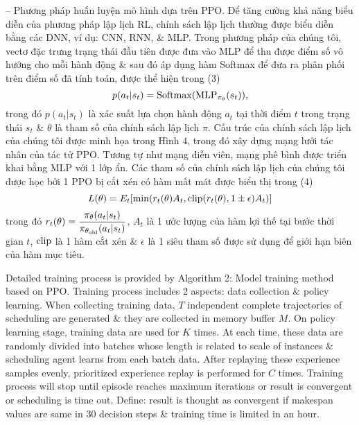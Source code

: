 \documentclass{article}
\begin{document}
\begin{itemize}
\begin{itemize}
        -- {\sf Phương pháp huấn luyện mô hình dựa trên PPO.} Để tăng cường khả năng biểu diễn của phương pháp lập lịch RL, chính sách lập lịch thường được biểu diễn bằng các DNN, ví dụ: CNN, RNN, \& MLP. Trong phương pháp của chúng tôi, vectơ đặc trưng trạng thái đầu tiên được đưa vào MLP để thu được điểm số vô hướng cho mỗi hành động \& sau đó áp dụng hàm Softmax để đưa ra phân phối trên điểm số đã tính toán, được thể hiện trong (3)
        \begin{equation*}
            p(a_t|s_t) = {\rm Softmax}({\rm MLP}_{\pi_\theta}(s_t)),
        \end{equation*}
        trong đó $p(a_t|s_t)$ là xác suất lựa chọn hành động $a_t$ tại thời điểm $t$ trong trạng thái $s_t$ \& $\theta$ là tham số của chính sách lập lịch $\pi$. Cấu trúc của chính sách lập lịch của chúng tôi được minh họa trong {\sf Hình 4}, trong đó xây dựng mạng lưới tác nhân của tác tử PPO. Tương tự như mạng diễn viên, mạng phê bình được triển khai bằng MLP với 1 lớp ẩn. Các tham số của chính sách lập lịch của chúng tôi được học bởi 1 PPO bị cắt xén có hàm mất mát được biểu thị trong (4)
        \begin{equation*}
            L(\theta) = E_t[\min(r_t(\theta)A_t,{\rm clip}(r_t(\theta),1\pm\epsilon)A_t)]
        \end{equation*}
        trong đó $r_t(\theta) = \dfrac{\pi_\theta(a_t|s_t)}{\pi_{\theta_{\rm old}}(a_t|s_t)}$, $A_t$ là 1 ước lượng của hàm lợi thế tại bước thời gian $t$, ${\rm clip}$ là 1 hàm cắt xén \& $\epsilon$ là 1 siêu tham số được sử dụng để giới hạn biên của hàm mục tiêu.

        Detailed training process is provided by {\sf Algorithm 2: Model training method based on PPO}. Training process includes 2 aspects: data collection \& policy learning. When collecting training data, $T$ independent complete trajectories of scheduling are generated \& they are collected in memory buffer $M$. On policy learning stage, training data are used for $K$ times. At each time, these data are randomly divided into batches whose length is related to scale of instances \& scheduling agent learns from each batch data. After replaying these experience samples evenly, prioritized experience replay is performed for $C$ times. Training process will stop until episode reaches maximum iterations or result is convergent or scheduling is time out. Define: result is thought as convergent if makespan values are same in 30 decision steps \& training time is limited in an hour.


\end{itemize}
\end{itemize}
\end{document}
